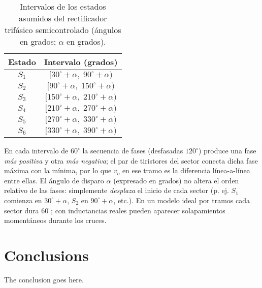 \documentclass[conference]{IEEEtran}
\begin{document}

\begin{table}[h!]
	\centering
	\small
	\begin{tabular}{@{}cc@{}}
		\toprule
		Estado & Intervalo (grados) \\ \midrule
	    $S_{1}$ & $[30^\circ+\alpha,\;90^\circ+\alpha)$ \\
		$S_{2}$ & $[90^\circ+\alpha,\;150^\circ+\alpha)$ \\
		$S_{3}$ & $[150^\circ+\alpha,\;210^\circ+\alpha)$ \\
		$S_{4}$ & $[210^\circ+\alpha,\;270^\circ+\alpha)$ \\
		$S_{5}$ & $[270^\circ+\alpha,\;330^\circ+\alpha)$ \\
		$S_{6}$ & $[330^\circ+\alpha,\;390^\circ+\alpha)$ \\ \bottomrule
	\end{tabular}
	\caption{Intervalos de los estados asumidos del rectificador trifásico semicontrolado (ángulos en grados; $\alpha$ en grados).}
	\label{tab:estados_grados}
\end{table}

\noindent En cada intervalo de $60^\circ$ la secuencia de fases (desfasadas $120^\circ$) produce una fase \emph{más positiva} y otra \emph{más negativa}; el par de tiristores del sector conecta dicha fase máxima con la mínima, por lo que $v_o$ en ese tramo es la diferencia línea-a-línea entre ellas. El ángulo de disparo $\alpha$ (expresado en grados) no altera el orden relativo de las fases: simplemente \emph{desplaza} el inicio de cada sector (p. ej. $S_{1}$ comienza en $30^\circ+\alpha$, $S_{2}$ en $90^\circ+\alpha$, etc.). En un modelo ideal por tramos cada sector dura $60^\circ$; con inductancias reales pueden aparecer solapamientos momentáneos durante los cruces.

\section{Conclusions}
The conclusion goes here.
\end{document}

